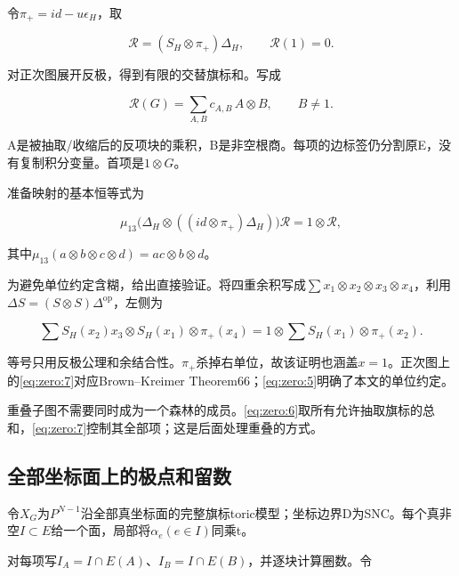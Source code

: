 \documentclass[11pt,a4paper,oneside]{ctexart}
\theoremstyle{cnplain}
\theoremstyle{definition}
\theoremstyle{remark}
\numberwithin{equation}{section}
\begin{document}
令\(\pi _+=id- u\epsilon _H\)，取

\begin{equation}
\mathcal R=(S_H\otimes\pi_+)\Delta_H,\qquad\mathcal R(1)=0.     \label{eq:zero:5}
\end{equation}

对正次图展开反极，得到有限的交替旗标和。写成

\begin{equation}
\mathcal R(G)=\sum_{A,B}c_{A,B}\,A\otimes B,\qquad B\ne1.      \label{eq:zero:6}
\end{equation}

A是被抽取/收缩后的反项块的乘积，B是非空根商。每项的边标签仍分割原E，没有复制积分变量。首项是\(1\otimes G\)。

准备映射的基本恒等式为

\begin{equation}
\mu_{13}\bigl(\Delta_H\otimes((id\otimes\pi_+)\Delta_H)\bigr)
           \mathcal R
       =1\otimes\mathcal R,                                  \label{eq:zero:7}
\end{equation}

其中\(\mu_{13}(a\otimes b\otimes c\otimes d)=ac\otimes b\otimes d\)。

为避免单位约定含糊，给出直接验证。将四重余积写成\(\sum x_1\otimes x_2\otimes x_3\otimes x_4\)，利用\(\Delta S=(S\otimes S)\Delta ^{\mathrm{op}}\)，左侧为

\begin{equation}
\sum S_H(x_2)x_3\otimes S_H(x_1)\otimes\pi_+(x_4)
   =1\otimes\sum S_H(x_1)\otimes\pi_+(x_2).
\end{equation}

等号只用反极公理和余结合性。\(\pi _+\)杀掉右单位，故该证明也涵盖\(x=1\)。正次图上的\eqref{eq:zero:7}对应Brown--Kreimer Theorem66；\eqref{eq:zero:5}明确了本文的单位约定。

重叠子图不需要同时成为一个森林的成员。\eqref{eq:zero:6}取所有允许抽取旗标的总和，\eqref{eq:zero:7}控制其全部项；这是后面处理重叠的方式。


\subsection{全部坐标面上的极点和留数}\label{sec:zero:5}

令\(X_G\)为\(P^{N- 1}\)沿全部真坐标面的完整旗标toric模型；坐标边界D为SNC。每个真非空\(I\subset E\)给一个面，局部将\(\alpha _e(e\in I)\)同乘t。

对每项写\(I_A=I\cap E(A)\)、\(I_B=I\cap E(B)\)，并逐块计算圈数。令
\end{document}
